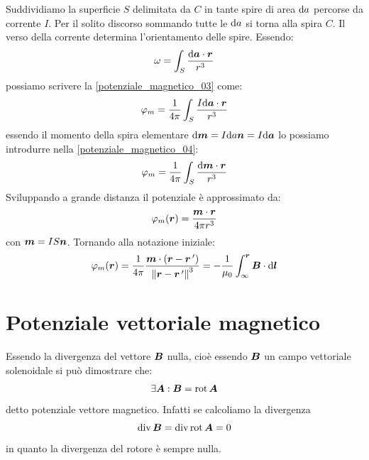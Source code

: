 Suddividiamo la superficie $S$ delimitata da $C$ in tante spire di area $\mathrm{d} a$ percorse da corrente $I$. Per il solito discorso sommando tutte le $\mathrm{d} a$ si torna alla spira $C$. Il verso della corrente determina l'orientamento delle spire. Essendo:
\[\omega=\int_S\frac{\mathrm{d}\boldsymbol{a}\cdot\boldsymbol{r}}{r^3}\]
possiamo scrivere la \eqref{potenziale_magnetico_03} come:
\begin{equation}
  \varphi_m=\frac{1}{4\pi}\int_S\frac{I\mathrm{d}\boldsymbol{a}\cdot\boldsymbol{r}}{r^3}
  \label{potenziale_magnetico_04}
\end{equation}
essendo il momento della spira elementare $\mathrm{d}\boldsymbol{m}=I\mathrm{d} a\boldsymbol{n}=I\mathrm{d}\boldsymbol{a}$ lo possiamo introdurre nella \eqref{potenziale_magnetico_04}:
\begin{equation}
  \varphi_m=\frac{1}{4\pi}\int_S\frac{\mathrm{d}\boldsymbol{m}\cdot\boldsymbol{r}}{r^3}
\end{equation}
Sviluppando a grande distanza il potenziale è approssimato da:
\begin{equation}
  \varphi_m(\boldsymbol{r})=\frac{\boldsymbol{m}\cdot\boldsymbol{r}}{4\pi r^3}
\end{equation}
con $\boldsymbol{m}=IS\boldsymbol{n}$. Tornando alla notazione iniziale:
\begin{equation}
  \varphi_m(\boldsymbol{r})=\frac{1}{4\pi}\frac{\boldsymbol{m}\cdot\left(\boldsymbol{r}-\boldsymbol{r}\,'\right)}{\left\lVert\boldsymbol{r}-\boldsymbol{r}\,'\right\rVert^3}=-\frac{1}{\mu_0}\int_\infty^{\boldsymbol{r}}\boldsymbol{B}\cdot\mathrm{d}\boldsymbol{l}
\end{equation}

\section{Potenziale vettoriale magnetico}
Essendo la divergenza del vettore $\boldsymbol{B}$ nulla, cioè essendo $\boldsymbol{B}$ un campo vettoriale solenoidale si può dimostrare che:
\begin{equation}
  \exists\boldsymbol{A}:\boldsymbol{B}=\operatorname{rot}\boldsymbol{A}
  \label{vet_magnetico00}
\end{equation}
detto potenziale vettore magnetico. Infatti se calcoliamo la divergenza
\[
\operatorname{div} \boldsymbol{B} = \operatorname{div}\operatorname{rot}\boldsymbol{A} = 0
\]
in quanto la divergenza del rotore è sempre nulla.

